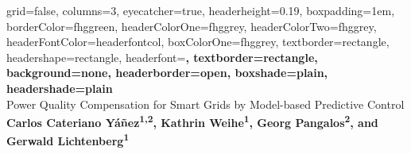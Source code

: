 \documentclass[a0paper,portrait]{baposter}
\begin{document}
\selectfont							%

\renewcommand{\labelitemi}{\scriptsize$\blacksquare$}		%
%
\background{ %
}

\begin{poster}{
grid=false,				 %
columns=3,				 %
eyecatcher=true,		 %
headerheight=0.19\textheight,
boxpadding=1em,
borderColor=fhggreen,    %
headerColorOne=fhggrey,  %
headerColorTwo=fhggrey,  %
headerFontColor=headerfontcol, %
boxColorOne=fhggrey,     %
textborder=rectangle,
headershape=rectangle,   %
headerfont=\Large\sf\bf, %
textborder=rectangle,
background=none,
headerborder=open, 		 %
boxshade=plain,
headershade=plain
}
{%
}
%
%
{\vspace*{2.1em} \\ \huge{Power Quality Compensation for Smart Grids by Model-based Predictive Control }} %
{\vspace{.4em} \smaller\textbf{Carlos Cateriano Y\'a\~nez\textsuperscript{1,2}, Kathrin Weihe\textsuperscript{1}, Georg Pangalos\textsuperscript{2}, and Gerwald Lichtenberg\textsuperscript{1}}  \\  %
  
}
\end{poster}
\end{document}

